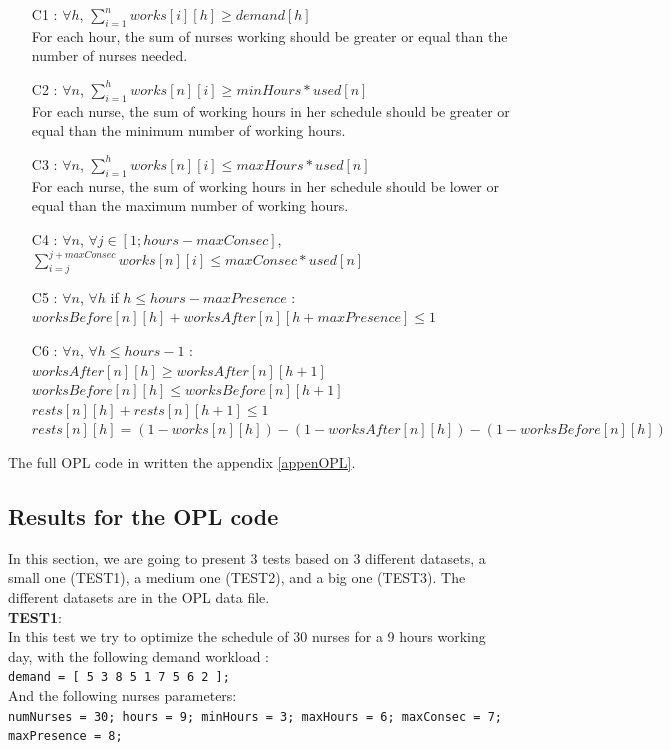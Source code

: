 \documentclass[11pt]{article}
\begin{document}
\begin{itemize}
\item[C1 :] $\forall h$,  $\displaystyle{\sum_{i=1}^{n} }works[i][h] \geq demand[h]$ \\
For each hour, the sum of nurses working should be greater or equal than the number of nurses needed.    
\item[C2 :] $\forall n$,  $\displaystyle{\sum_{i=1}^{h}} works[n][i] \geq minHours*used[n]$\\
For each nurse, the sum of working hours in her schedule should be greater or equal than the minimum number of working hours.
\item[C3 :] $\forall n$,  $\displaystyle{\sum_{i=1}^{h}} works[n][i] \leq maxHours*used[n]$ \\
For each nurse, the sum of working hours in her schedule should be lower or equal than the maximum number of working hours.
\item[C4 :] $\forall n$, $\forall j\in[1; hours-maxConsec]$, $\displaystyle{\sum_{i=j}^{j+maxConsec}} works[n][i] \leq maxConsec*used[n]$ 
\item[C5 :] $\forall n$, $\forall h$ if $h \leq hours-maxPresence$ :\\$worksBefore[n][h]+worksAfter[n][h+maxPresence] \leq 1$
\item[C6 :] $\forall n$, $\forall h\leq hours-1$ : \\$worksAfter[n][h] \geq worksAfter[n][h+1]$\\$worksBefore[n][h] \leq worksBefore[n][h+1]$\\$rests[n][h]+rests[n][h+1]\leq 1$\\$rests[n][h] = (1-works[n][h]) - (1-worksAfter[n][h]) - (1-worksBefore[n][h])$ \\
\end{itemize}

\noindent
The full  OPL code in written the appendix \ref{appenOPL}.

\subsection{Results for the OPL code}
In this section, we are going to present 3 tests based on 3 different datasets, a small one (TEST1), a medium one (TEST2), and a big one (TEST3). The different datasets are in the OPL data file. \\

\noindent
{\bf TEST1}:\\
In this test we try to optimize the schedule of 30 nurses for a 9 hours working day, with the following demand workload : \\
{\tt demand = [ 5 3 8 5 1 7 5 6 2 ];}\\
And the following nurses parameters:\\
{\tt numNurses = 30;
 hours =  9;
 minHours = 3;
 maxHours = 6;
 maxConsec = 7;
 maxPresence = 8;}\\
\end{document}
